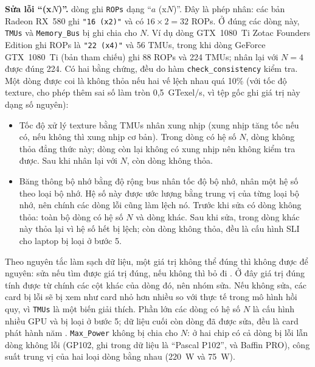 {\sloppy\textbf{Sửa lỗi ``(x$N$)''.} \PreRopsMultiplier{} dòng ghi \texttt{ROPs} dạng
``$a$ (x$N$)''. Đây là phép nhân: các bản Radeon RX~580 ghi \verb|"16 (x2)"| và có
$16 \times 2 = 32$ ROPs. Ở đúng các dòng này, \texttt{TMUs} và \texttt{Memory\_Bus} bị
ghi chia cho $N$. Ví dụ dòng GTX~1080~Ti Zotac Founders Edition ghi ROPs là
\verb|"22 (x4)"| và 56 TMUs, trong khi dòng GeForce GTX~1080~Ti (bản tham chiếu) ghi 88
ROPs và 224 TMUs; nhân lại với $N = 4$ được đúng 224. Có hai bằng chứng, đều do hàm
\texttt{check\_consistency} kiểm tra. Một dòng được coi là không thỏa nếu hai vế lệch
nhau quá 10\% (với tốc độ texture, cho phép thêm sai số làm tròn 0,5~GTexel/s, vì tệp
gốc ghi giá trị này dạng số nguyên):\par}
\begin{itemize}
  \item Tốc độ xử lý texture bằng TMUs nhân xung nhịp (xung nhịp tăng tốc nếu có,
    nếu không thì xung nhịp cơ bản). Trong \PreRopsMultiplier{} dòng có hệ số $N$,
    \PreTextureMismatchBefore{} dòng không thỏa đẳng thức này; \PreTextureUntestable{}
    dòng còn lại không có xung nhịp nên không kiểm tra được. Sau khi nhân lại với $N$,
    còn \PreTextureMismatchAfter{} dòng không thỏa.
  \item Băng thông bộ nhớ bằng độ rộng bus nhân tốc độ bộ nhớ, nhân một hệ số theo
    loại bộ nhớ. Hệ số này được ước lượng bằng trung vị của từng loại bộ nhớ, nên chính các
    dòng lỗi cũng làm lệch nó. Trước khi sửa có \PreBandwidthMismatchBefore{} dòng không
    thỏa: toàn bộ \PreRopsMultiplier{} dòng có hệ số $N$ và
    \PreBandwidthMismatchNotRepaired{} dòng khác. Sau khi sửa, \PreBandwidthMismatchShifted{}
    trong \PreBandwidthMismatchNotRepaired{} dòng khác này thỏa lại vì hệ số hết bị lệch;
    còn \PreBandwidthMismatchAfter{} dòng không thỏa, đều là cấu hình SLI cho laptop bị loại
    ở bước 5.
\end{itemize}
Theo nguyên tắc làm sạch dữ liệu, một giá trị không thể đúng thì không được để nguyên: sửa
nếu tìm được giá trị đúng, nếu không thì bỏ đi \cite{vandenbroeck2005}. Ở đây giá trị đúng
tính được từ chính các cột khác của dòng đó, nên nhóm sửa.
Nếu không sửa, các card bị lỗi sẽ bị xem như card nhỏ hơn nhiều so với thực tế trong mô
hình hồi quy, vì \texttt{TMUs} là một biến giải thích. Phần lớn các dòng có hệ số $N$ là
cấu hình nhiều GPU và bị loại ở bước 5; dữ liệu cuối còn \PreRepairedInFinal{} dòng đã
được sửa, đều là card phát hành năm \PreRepairedYears. \texttt{Max\_Power} không bị chia
cho $N$: ở hai chip có cả dòng bị lỗi lẫn dòng không lỗi (GP102, ghi trong dữ liệu là
``Pascal P102'', và Baffin PRO), công suất trung vị của hai loại dòng bằng nhau (220~W và
75~W).


